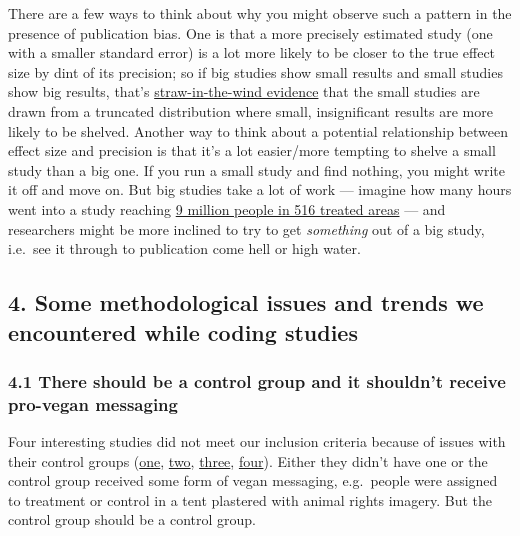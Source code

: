 \documentclass[
  letterpaper,
  DIV=11,
  numbers=noendperiod]{scrartcl}
\begin{document}
There are a few ways to think about why you might observe such a pattern
in the presence of publication bias. One is that a more precisely
estimated study (one with a smaller standard error) is a lot more likely
to be closer to the true effect size by dint of its precision; so if big
studies show small results and small studies show big results, that's
\href{https://polisci.berkeley.edu/sites/default/files/people/u3827/Understanding\%20Process\%20Tracing.pdf}{straw-in-the-wind
evidence} that the small studies are drawn from a truncated distribution
where small, insignificant results are more likely to be shelved.
Another way to think about a potential relationship between effect size
and precision is that it's a lot easier/more tempting to shelve a small
study than a big one. If you run a small study and find nothing, you
might write it off and move on. But big studies take a lot of work ---
imagine how many hours went into a study reaching
\href{https://www.science.org/doi/full/10.1126/science.abd3446}{9
million people in 516 treated areas} --- and researchers might be more
inclined to try to get \emph{something} out of a big study, i.e.~see it
through to publication come hell or high water.

\subsection{4. Some methodological issues and trends we encountered
while coding
studies}\label{some-methodological-issues-and-trends-we-encountered-while-coding-studies}

\subsubsection{4.1 There should be a control group and it shouldn't
receive pro-vegan
messaging}\label{there-should-be-a-control-group-and-it-shouldnt-receive-pro-vegan-messaging}

Four interesting studies did not meet our inclusion criteria because of
issues with their control groups
(\href{https://faunalytics.org/wp-content/uploads/2017/12/Animal-Equality-Report-Final.pdf}{one},
\href{https://assets.ctfassets.net/ww1ie0z745y7/5BclqQGYj8oJ6Txsj1GGQF/f6feb92bdb4cbd200b6e382a731325b1/E001R02-which-leaflet-is-more-effective-reanalysis.pdf}{two},
\href{https://www.frontiersin.org/articles/10.3389/fpsyg.2016.00607/full}{three},
\href{https://osf.io/fapu8/}{four}). Either they didn't have one or the
control group received some form of vegan messaging, e.g.~people were
assigned to treatment or control in a tent plastered with animal rights
imagery. But the control group should be a control group.
\end{document}

